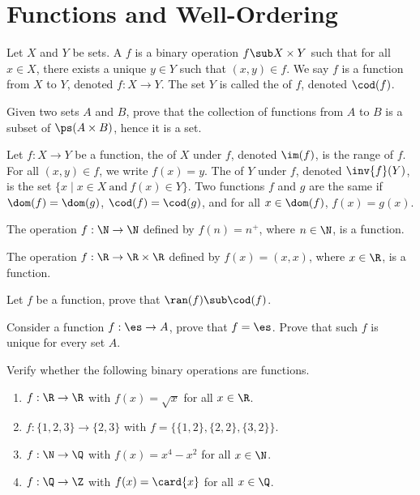 \documentclass[10pt]{article}
\begin{document}
\section{Functions and Well-Ordering}
\begin{definition}
    Let $X$ and $Y$ be sets. A  $f$ is a binary operation $f\sub X\times Y$ such that for all $x\in X$, there exists a unique $y\in Y$ such that $(x,y)\in f$. We say $f$ is a function from $X$ to $Y$, denoted $f:X\to Y$. The set $Y$ is called the  of $f$, denoted $\cod(f)$.
\end{definition}
\begin{problem}
    Given two sets $A$ and $B$, prove that the collection of functions from $A$ to $B$ is a subset of $\ps(A\times B)$, hence it is a set.
\end{problem}
\begin{definition}
    Let $f:X\to Y$ be a function, the  of $X$ under $f$, denoted $\im(f)$, is the range of $f$. For all $(x,y)\in f$, we write $f(x)=y$. The  of $Y$ under $f$, denoted $\inv{f}(Y)$, is the set $\{x\mid x\in X\ \text{and}\ f(x)\in Y\}$. Two functions $f$ and $g$ are the same if $\dom(f)=\dom(g)$, $\cod(f)=\cod(g)$, and for all $x\in\dom(f)$, $f(x)=g(x)$.
\end{definition}
\begin{example}
    The operation $f:\N\to\N$ defined by $f(n)={n}^{+}$, where $n\in\N$, is a function.
\end{example}
\begin{example}
    The operation $f:\R\to\R\times\R$ defined by $f(x)=(x,x)$, where $x\in\R$, is a function.
\end{example}
\begin{problem}
    Let $f$ be a function, prove that $\ran(f)\sub\cod(f)$.
\end{problem}
\begin{problem}
    Consider a function $f:\es\to A$, prove that $f=\es$. Prove that such $f$ is unique for every set $A$.
\end{problem}
\begin{problem}
    Verify whether the following binary operations are functions.
    \begin{enumerate}
        \item $f:\R\to\R$ with $f(x)=\sqrt{x}$ for all $x\in\R$.
        \item $f:\{1,2,3\}\to\{2,3\}$ with $f=\{\{1,2\},\{2,2\},\{3,2\}\}$.
        \item $f:\N\to\Q$ with $f(x)={x}^{4}-{x}^{2}$ for all $x\in\N$.
        \item $f:\Q\to\Z$ with $f(x)=\card{x}$ for all $x\in\Q$.
    \end{enumerate}
\end{problem}
\end{document}
